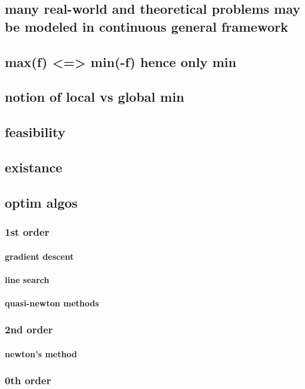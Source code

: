 \subsection{many real-world and theoretical problems may be modeled in continuous general framework}

\subsection{max(f) <=> min(-f) hence only min}

\subsection{notion of local vs global min}

\subsection{feasibility}
\subsection{existance}

\subsection{optim algos}
\subsubsection{1st order}
\paragraph{gradient descent}
\paragraph{line search}
\paragraph{quasi-newton methods}
\subsubsection{2nd order}
\paragraph{newton's method}
\subsubsection{0th order}
